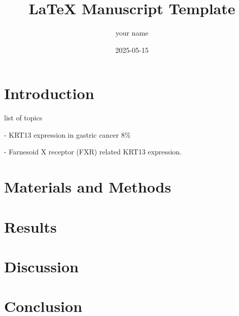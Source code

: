 \documentclass{article}
\begin{document}
\title{LaTeX Manuscript Template}
\author{your name}
\date{2025-05-15}

\maketitle



\section{Introduction}

list of topics

- KRT13 expression in gastric cancer 8\%
\cite{lennartzCytokeratin13CK132023}

- Farnesoid X receptor (FXR) related KRT13 expression.
\cite{lianFarnesoidReceptorProtects2011}

\section{Materials and Methods}

\section{Results}

\section{Discussion}

\section{Conclusion}




\end{document}
